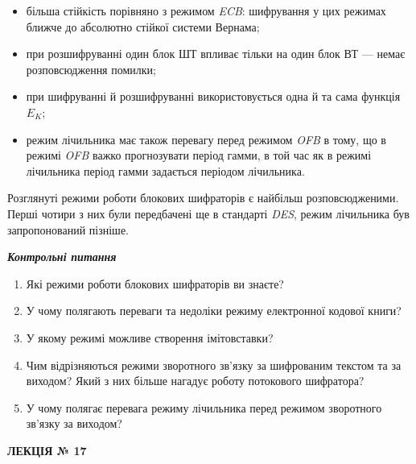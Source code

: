 \liststyleWWviiiNumxxvii
\begin{itemize}
\item більша стійкість порівняно з режимом \textit{ECB}: шифрування у цих
режимах ближче до абсолютно стійкої системи Вернама;
\item при розшифруванні один блок ШТ впливає тільки на один блок ВТ --- немає
розповсюдження помилки;
\item при шифруванні й розшифруванні використовується одна й та сама функція 
${E_{{K}}}$;
\item режим лічильника має також перевагу перед режимом \textit{OFB} в тому, що
в режимі \textit{OFB}\textit{ }важко прогнозувати період гамми, в той час як в
режимі лічильника період гамми задається періодом лічильника.
\end{itemize}

\bigskip

Розглянуті режими роботи блокових шифраторів є найбільш розповсюдженими. Перші
чотири з них були передбачені ще в стандарті \textit{DES}, режим
лічильника\textit{ }був запропонований пізніше.


\bigskip


\bigskip

{\centering\bfseries\itshape
Контрольні питання
\par}


\bigskip


\bigskip

\liststyleWWviiiNumxx
\begin{enumerate}
\item Які режими роботи блокових шифраторів ви знаєте?
\item У чому полягають переваги та недоліки режиму електронної кодової книги?
\item У якому режимі можливе створення імітовставки?
\item Чим відрізняються режими зворотного зв’язку за шифрованим текстом та за
виходом? Який з них більше нагадує роботу потокового шифратора?
\item У чому полягає перевага режиму лічильника перед режимом  зворотного
зв’язку за виходом?
\end{enumerate}

\bigskip


\bigskip


\bigskip


\bigskip

{\bfseries
ЛЕКЦІЯ № 17}


\bigskip

